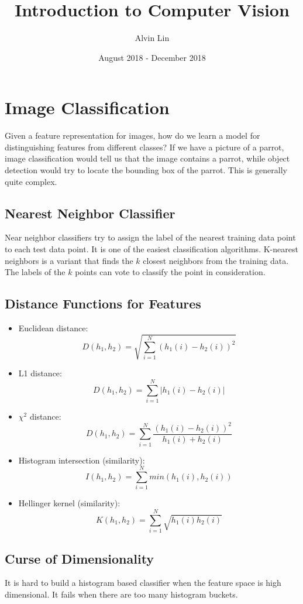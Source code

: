 \documentclass{math}
\title{Introduction to Computer Vision}
\author{Alvin Lin}
\date{August 2018 - December 2018}
\begin{document}
\maketitle

\section*{Image Classification}
Given a feature representation for images, how do we learn a model for
distinguishing features from different classes? If we have a picture of a
parrot, image classification would tell us that the image contains a parrot,
while object detection would try to locate the bounding box of the parrot.
This is generally quite complex.

\subsection*{Nearest Neighbor Classifier}
Near neighbor classifiers try to assign the label of the nearest training data
point to each test data point. It is one of the easiest classification
algorithms. K-nearest neighbors is a variant that finds the \( k \) closest
neighbors from the training data. The labels of the \( k \) points can vote
to classify the point in consideration.

\subsection*{Distance Functions for Features}
\begin{itemize}
  \item Euclidean distance:
  \[ D(h_1,h_2) = \sqrt{\sum_{i=1}^{N}(h_1(i)-h_2(i))^2} \]
  \item L1 distance:
  \[ D(h_1,h_2) = \sum_{i=1}^{N}\bigg|h_1(i)-h_2(i)\bigg| \]
  \item \( \chi^2 \) distance:
  \[ D(h_1,h_2) = \sum_{i=1}^{N}\frac{(h_1(i)-h_2(i))^2}{h_1(i)+h_2(i)} \]
  \item Histogram intersection (similarity):
  \[ I(h_1,h_2) = \sum_{i=1}^{N}min(h_1(i),h_2(i)) \]
  \item Hellinger kernel (similarity):
  \[ K(h_1,h_2) = \sum_{i=1}^{N}\sqrt{h_1(i)h_2(i)} \]
\end{itemize}

\subsection*{Curse of Dimensionality}
It is hard to build a histogram based classifier when the feature space is
high dimensional. It fails when there are too many histogram buckets.
\end{document}

